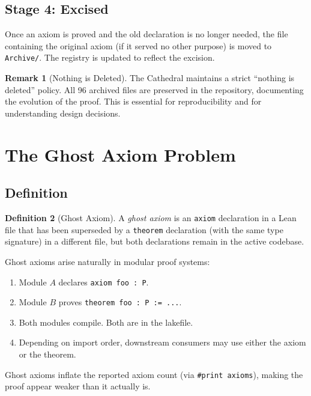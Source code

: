 \documentclass[11pt,a4paper]{article}
\theoremstyle{definition}
\newtheorem{definition}{Definition}[section]
\newtheorem{remark}[definition]{Remark}
\newcommand{\lean}[1]{\texttt{#1}}
\begin{document}
\subsection{Stage 4: Excised}

Once an axiom is proved and the old declaration is no longer needed,
the file containing the original axiom (if it served no other purpose)
is moved to \lean{Archive/}. The registry is updated to reflect the
excision.

\begin{remark}[Nothing is Deleted]
The Cathedral maintains a strict ``nothing is deleted'' policy. All
96 archived files are preserved in the repository, documenting the
evolution of the proof. This is essential for reproducibility and
for understanding design decisions.
\end{remark}

\section{The Ghost Axiom Problem}
\label{sec:ghost}

\subsection{Definition}

\begin{definition}[Ghost Axiom]
A \emph{ghost axiom} is an \lean{axiom} declaration in a Lean file
that has been superseded by a \lean{theorem} declaration (with the
same type signature) in a different file, but both declarations
remain in the active codebase.
\end{definition}

Ghost axioms arise naturally in modular proof systems:

\begin{enumerate}
  \item Module $A$ declares \lean{axiom foo : P}.
  \item Module $B$ proves \lean{theorem foo : P := ...}.
  \item Both modules compile. Both are in the lakefile.
  \item Depending on import order, downstream consumers may use
    either the axiom or the theorem.
\end{enumerate}

Ghost axioms inflate the reported axiom count (via \lean{\#print axioms}),
making the proof appear weaker than it actually is.
\end{document}

